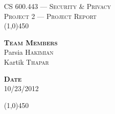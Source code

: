 \documentclass[a4paper, 10pt]{article}
\begin{document}
\begin{center}
	\textsc{\LARGE CS 600.443 --- Security \& Privacy}\\[0.5cm]
	\textsc{\Large Project 2 --- Project Report}\\[0.25cm]
	\line(1,0){450}\\[10pt]
\end{center}

\begin{minipage}{0.4\textwidth}
\begin{flushleft} \large
\textsc{\textbf{Team Members}}\\
Parsia \textsc{Hakimian}\\
Kartik \textsc{Thapar}
\end{flushleft}
\end{minipage}
\begin{minipage}{0.5\textwidth}
\begin{flushright} \large
\textsc{\textbf{Date}}\\
10/23/2012
\end{flushright}
\end{minipage}
\begin{center}
	\line(1,0){450}\\[15pt]
\end{center}



\pagebreak

\end{document}
